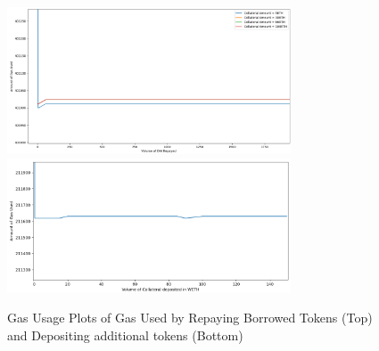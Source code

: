 \begin{figure}[htb!]
    \centering
    \includegraphics[width=0.75\textwidth]{project/Images/RepayFees2.png}\\
    \includegraphics[width=0.75\textwidth]{project/Images/depositFeesPlot2.png}
    \caption{Gas Usage Plots of Gas Used by Repaying Borrowed Tokens (Top) and Depositing additional tokens (Bottom) \label{fig:gasPlots2}}
\end{figure}

